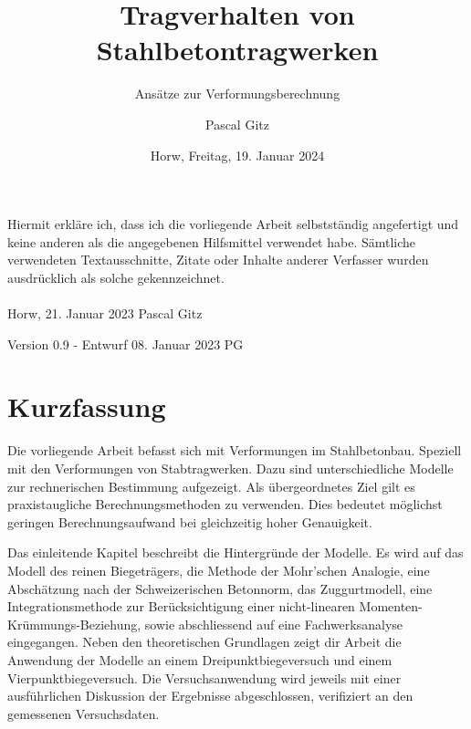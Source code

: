 \documentclass[
  12pt,
  letterpaper,
  egregdoesnotlikesansseriftitles]{scrreprt}
\title{Tragverhalten von Stahlbetontragwerken}
\subtitle
{Ansätze zur Verformungsberechnung}
\date{\large Horw, Freitag, 19. Januar 2024}
\author{Pascal Gitz}
\begin{document}
\maketitle

Hiermit erkläre ich, dass ich die vorliegende Arbeit selbstständig angefertigt und keine anderen als die angegebenen Hilfsmittel verwendet habe. Sämtliche verwendeten Textausschnitte, Zitate oder Inhalte anderer Verfasser wurden ausdrücklich als solche gekennzeichnet.\\%
%
\\%
%
Horw, 21. Januar 2023 \hfill Pascal Gitz%

\vfill

Version 0.9 - Entwurf \hfill 08. Januar 2023 \quad \quad \quad \quad \quad PG\\

\newpage

\chapter*{Kurzfassung}

Die vorliegende Arbeit befasst sich mit Verformungen im Stahlbetonbau. Speziell mit den Verformungen von Stabtragwerken. Dazu sind unterschiedliche Modelle zur rechnerischen Bestimmung aufgezeigt. Als übergeordnetes Ziel gilt es praxistaugliche Berechnungsmethoden zu verwenden. Dies bedeutet möglichst geringen Berechnungsaufwand bei gleichzeitig hoher Genauigkeit.  

Das einleitende Kapitel beschreibt die Hintergründe der Modelle. Es wird auf das Modell des reinen Biegeträgers, die Methode der Mohr'schen Analogie, eine Abschätzung nach der Schweizerischen Betonnorm, das Zuggurtmodell, eine Integrationsmethode zur Berücksichtigung einer nicht-linearen Momenten-Krümmungs-Beziehung, sowie abschliessend auf eine Fachwerksanalyse eingegangen. Neben den theoretischen Grundlagen zeigt dir Arbeit die Anwendung der Modelle an einem Dreipunktbiegeversuch und einem Vierpunktbiegeversuch. Die Versuchsanwendung wird jeweils mit einer ausführlichen Diskussion der Ergebnisse abgeschlossen, verifiziert an den gemessenen Versuchsdaten. 
\end{document}
